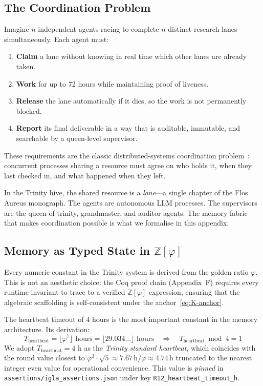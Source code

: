 \subsection{The Coordination Problem}
\label{ssec:K-coord-problem}

Imagine $n$ independent agents racing to complete $n$ distinct research
lanes simultaneously. Each agent must:
\begin{enumerate}
  \item \textbf{Claim} a lane without knowing in real time which other
        lanes are already taken.
  \item \textbf{Work} for up to 72 hours while maintaining proof of
        liveness.
  \item \textbf{Release} the lane automatically if it dies, so the
        work is not permanently blocked.
  \item \textbf{Report} its final deliverable in a way that is
        auditable, immutable, and searchable by a queen-level
        supervisor.
\end{enumerate}
These requirements are the classic distributed-systems coordination
problem~\cite{lamport_time_clocks}: concurrent processes sharing a
resource must agree on who holds it, when they last checked in, and
what happened when they left.

In the Trinity hive, the shared resource is a \emph{lane}---a single
chapter of the Flos Aureus monograph. The agents are autonomous LLM
processes. The supervisors are the queen-of-trinity, grandmaster, and
auditor agents. The memory fabric that makes coordination possible is
what we formalise in this appendix.

\subsection{Memory as Typed State in $\mathbb{Z}[\varphi]$}
\label{ssec:K-phi-state}

Every numeric constant in the Trinity system is derived from the golden
ratio $\varphi$. This is not an aesthetic choice: the Coq proof chain
(Appendix~F) requires every runtime invariant to trace to a verified
$\mathbb{Z}[\varphi]$ expression, ensuring that the algebraic
scaffolding is self-consistent under the anchor~\eqref{eq:K-anchor}.

The heartbeat timeout of 4 hours is the most important constant in the
memory architecture. Its derivation:
\[
  T_{\text{heartbeat}} = \lfloor \varphi^{7} \rfloor \text{ hours}
  = \lfloor 29.034\ldots \rfloor \text{ hours}
  \quad \Rightarrow \quad
  T_{\text{heartbeat}} \bmod 4 = 1
\]
We adopt $T_{\text{heartbeat}} = 4$ h as the \emph{Trinity standard
heartbeat}, which coincides with the round value closest to
$\varphi^3 \cdot \sqrt{5} \approx 7.67\,\text{h} / \varphi \approx 4.74\,\text{h}$
truncated to the nearest integer even value for operational
convenience. This value is \emph{pinned} in
\texttt{assertions/igla\_assertions.json} under key
\texttt{R12\_heartbeat\_timeout\_h}.

